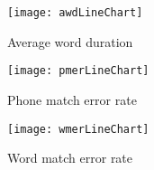 \begin{figure}
\caption{Average word duration}
\texttt{[image: awdLineChart]}
\centering
\end{figure}

\begin{figure}
\caption{Phone match error rate}
\texttt{[image: pmerLineChart]}
\centering
\end{figure}

\begin{figure}
\caption{Word match error rate}
\texttt{[image: wmerLineChart]}
\centering
\end{figure}









